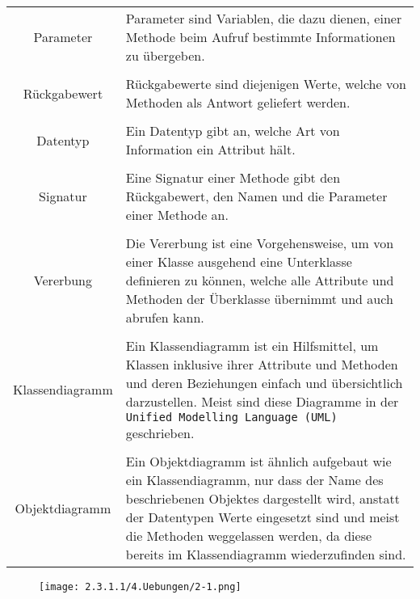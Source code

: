 \documentclass[]{scrartcl}   %
\begin{document}
\begin{table}[ht]
\centering
\begin{tabular}{c|p{10cm}}
    \\Parameter & Parameter sind Variablen, die dazu dienen, einer Methode beim Aufruf bestimmte Informationen zu übergeben.\footnotemark\\

    \\Rückgabewert & Rückgabewerte sind diejenigen Werte, welche von Methoden als Antwort geliefert werden.\\

	\\Datentyp & Ein Datentyp gibt an, welche Art von Information ein Attribut hält.\\
	
	\\Signatur & Eine Signatur einer Methode gibt den Rückgabewert, den Namen und die Parameter einer Methode an.\\

	\\Vererbung & Die Vererbung ist eine Vorgehensweise, um von einer Klasse ausgehend eine Unterklasse definieren zu können, welche alle Attribute und Methoden der Überklasse übernimmt und auch abrufen kann.\\

	\\Klassendiagramm & Ein Klassendiagramm ist ein Hilfsmittel, um Klassen inklusive ihrer Attribute und Methoden und deren Beziehungen einfach und übersichtlich darzustellen. Meist sind diese Diagramme in der \texttt{Unified Modelling Language (UML)} geschrieben.\\

	\\Objektdiagramm & Ein Objektdiagramm ist ähnlich aufgebaut wie ein Klassendiagramm, nur dass der Name des beschriebenen Objektes dargestellt wird, anstatt der Datentypen Werte eingesetzt sind und meist die Methoden weggelassen werden, da diese bereits im Klassendiagramm wiederzufinden sind.\\
\end{tabular}
\end{table}


\newpage

\begin{figure}[ht]
    \centering
	\texttt{[image: 2.3.1.1/4.Uebungen/2-1.png]}
\end{figure}
\end{document}

